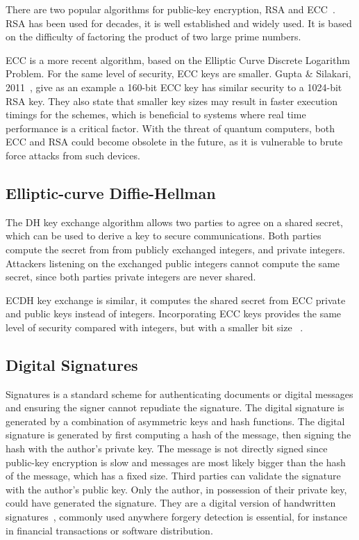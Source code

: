 There are two popular algorithms for public-key encryption, \ac{RSA} and \ac{ECC}~\cite{mahto2016security}.
\ac{RSA} has been used for decades, it is well established and widely used. It is based on the difficulty of factoring the product of two large prime numbers.

\ac{ECC} is a more recent algorithm, based on the Elliptic Curve Discrete Logarithm Problem. For the same level of security, \ac{ECC} keys are smaller. Gupta \& Silakari, 2011~\cite{eccoverrsa}, give as an example a 160-bit \ac{ECC} key has similar security to a 1024-bit \ac{RSA} key. They also state that smaller key sizes may result in faster execution timings for the schemes, which is beneficial to systems where real time performance is a critical factor.
With the threat of quantum computers, both \ac{ECC} and \ac{RSA} could become obsolete in the future, as it is vulnerable to brute force attacks from such devices.

\subsection{Elliptic-curve Diffie-Hellman}\label{chap:background:crypto:ecdh}

The \ac{DH} key exchange algorithm allows two parties to agree on a shared secret, which can be used to derive a key to secure communications. Both parties compute the secret from from publicly exchanged integers, and private integers. Attackers listening on the exchanged public integers cannot compute the same secret, since both parties private integers are never shared.

\ac{ECDH} key exchange is similar, it computes the shared secret from \ac{ECC} private and public keys instead of integers. Incorporating \ac{ECC} keys provides the same level of security compared with integers, but with a smaller bit size ~\cite{fiskiran2002workload}.


\subsection{Digital Signatures}\label{chap:background:crypto:signatures}

Signatures is a standard scheme for authenticating documents or digital messages and ensuring the signer cannot repudiate the signature. The digital signature is generated by a combination of asymmetric keys and hash functions.
The digital signature is generated by first computing a hash of the message, then signing the hash with the author's private key. The message is not directly signed since public-key encryption is slow and messages are most likely bigger than the hash of the message, which has a fixed size. Third parties can validate the signature with the author's public key. Only the author, in possession of their private key, could have generated the signature.
They are a digital version of handwritten signatures~\cite{digitalsignatures}, commonly used anywhere forgery detection is essential, for instance in financial transactions or software distribution.

